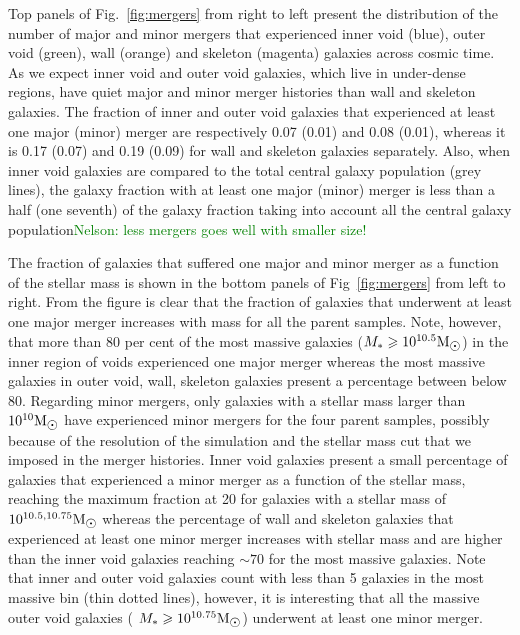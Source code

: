 \documentclass[a4paper,fleqn,usenatbib,letter]{mnras}
\newcommand{\Msun}{\rm M_{\sun}}
\begin{document}
Top panels of Fig.~\ref{fig:mergers} from right to left  present the distribution of the number of  major and minor mergers that experienced inner void (blue), outer void (green), wall (orange) and skeleton (magenta) galaxies across cosmic time. As we expect inner void and outer void galaxies, which live in under-dense regions, have quiet  major and minor merger histories than wall and skeleton galaxies. The fraction of inner and outer  void galaxies that experienced at least one major (minor) merger are respectively  0.07 (0.01) and 0.08 (0.01),  whereas it  is   0.17 (0.07) and 0.19 (0.09) for wall and skeleton galaxies separately. 
Also, when inner void galaxies are compared to the total central galaxy population (grey lines), the galaxy fraction with at least one major (minor) merger is less than  a half (one seventh) of the galaxy fraction taking into account all the central galaxy population\textcolor{green}{Nelson: less mergers goes well with smaller size!}

The fraction of galaxies that suffered one major and minor  merger as a function of the stellar mass is shown  in the bottom panels of Fig~\ref{fig:mergers} from left to right. From the figure is clear that  the fraction of galaxies that underwent at least one major merger increases with mass for all the parent samples. Note, however, that more than 80 per cent of the most massive galaxies ($M_{*}\geq10^{10.5}\Msun$) in the inner region of voids experienced one major merger whereas  the most massive galaxies in outer void,  wall, skeleton galaxies present a percentage between  below 80.  Regarding minor mergers, only galaxies with a stellar mass larger than $10^{10}\Msun$ have experienced minor mergers for the four parent samples, possibly because of the resolution of the simulation and the stellar mass cut that we imposed in the merger histories. Inner void galaxies present a small percentage of galaxies that experienced a minor merger as a function of the stellar mass, reaching the maximum fraction at 20 for galaxies with a stellar mass of $10^{10.5,10.75}\Msun$ whereas the percentage of  wall and skeleton galaxies that experienced at least one minor merger increases with stellar mass  and are higher than the inner void galaxies reaching $\sim 70$ for the most massive galaxies. Note that inner and outer void galaxies count with less than 5 galaxies in the most massive bin (thin dotted lines), however, it is interesting that all the massive outer void galaxies ( $M_{*}\geq10^{10.75}\Msun$) underwent at least one minor merger.  
  
\end{document}
